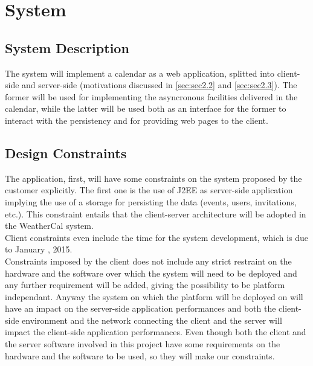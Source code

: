 \chapter{System} \label{cap:cap2}

\section{System Description}
The system will implement a calendar as a web application, splitted into client-side and server-side (motivations discussed in \autoref{sec:sec2.2} and \autoref{sec:sec2.3}). The former will be used for implementing the asyncronous facilities delivered in the calendar, while the latter will be used both as an interface for the former to interact with the persistency and for providing web pages to the client.

\section{Design Constraints} \label{sec:sec2.2}
The application, first, will have some constraints on the system proposed by the customer explicitly. The first one is the use of J2EE as server-side application implying the use of a storage for persisting the data (events, users, invitations, etc.). This constraint entails that the client-server architecture will be adopted in the WeatherCal system.\\
Client constraints even include the time for the system development, which is due to January , 2015.\\
Constraints imposed by the client does not include any strict restraint on the hardware and the software over which the system will need to be deployed and any further requirement will be added, giving the possibility to be platform independant. Anyway the system on which the platform will be deployed on will have an impact on the server-side application performances and both the client-side environment and the network connecting the client and the server will impact the client-side application performances. Even though both the client and the server software involved in this project have some requirements on the hardware and the software to be used, so they will make our constraints.


